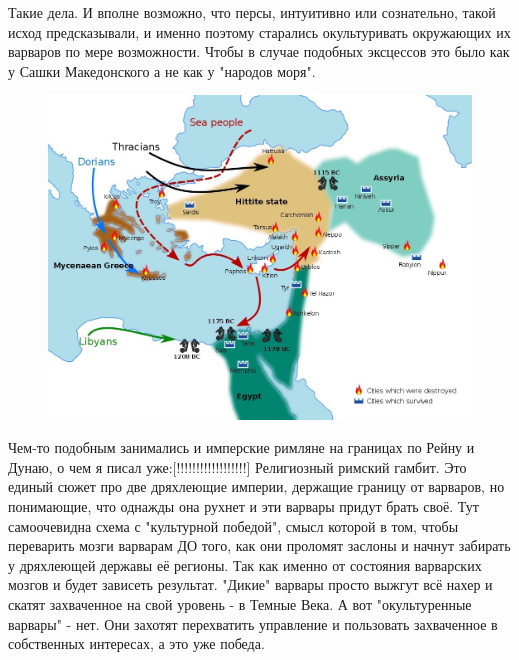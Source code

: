 Такие дела. И вполне возможно, что персы, интуитивно или сознательно, такой исход предсказывали, и именно поэтому старались окультуривать окружающих их варваров по мере возможности. Чтобы в случае подобных эксцессов это было как у Сашки Македонского а не как у "народов моря".

\begin{figure}[h!tb] 
	\centering\includegraphics[scale=0.3]{MakedoskiyShort/1601538507153295553.png}
\end{figure}




Чем-то подобным занимались и имперские римляне на границах по Рейну и Дунаю, о чем я писал уже:[!!!!!!!!!!!!!!!!!!] Религиозный римский гамбит. Это единый сюжет про две дряхлеющие империи, держащие границу от варваров, но понимающие, что однажды она рухнет и эти варвары придут брать своё. Тут самоочевидна схема с "культурной победой", смысл которой в том, чтобы переварить мозги варварам ДО того, как они проломят заслоны и начнут забирать у дряхлеющей державы её регионы. Так как именно от состояния варварских мозгов и будет зависеть результат. "Дикие" варвары просто выжгут всё нахер и скатят захваченное на свой уровень - в Темные Века. А вот "окультуренные варвары" - нет. Они захотят перехватить управление и пользовать захваченное в собственных интересах, а это уже победа.


